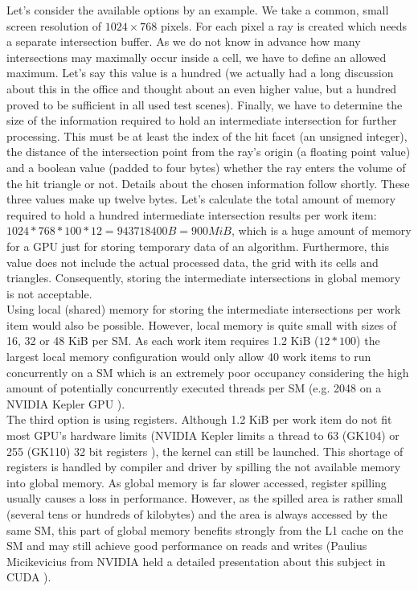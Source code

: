 Let's consider the available options by an example. We take a common, small screen resolution of $1024 \times 768$ pixels. For each pixel a ray is created which needs a separate intersection buffer. As we do not know in advance how many intersections may maximally occur inside a cell, we have to define an allowed maximum. Let's say this value is a hundred (we actually had a long discussion about this in the office and thought about an even higher value, but a hundred proved to be sufficient in all used test scenes). Finally, we have to determine the size of the information required to hold an intermediate intersection for further processing. This must be at least the index of the hit facet (an unsigned integer), the distance of the intersection point from the ray's origin (a floating point value) and a boolean value (padded to four bytes) whether the ray enters the volume of the hit triangle or not. Details about the chosen information follow shortly. These three values make up twelve bytes. Let's calculate the total amount of memory required to hold a hundred intermediate intersection results per work item: $1024 * 768 * 100 * 12 = 943718400 B = 900 MiB$, which is a huge amount of memory for a GPU just for storing temporary data of an algorithm. Furthermore, this value does not include the actual processed data, the grid with its cells and triangles. Consequently, storing the intermediate intersections in global memory is not acceptable. \\
Using local (shared) memory for storing the intermediate intersections per work item would also be possible. However, local memory is quite small with sizes of 16, 32 or 48 KiB per SM. As each work item requires 1.2 KiB ($12 * 100$) the largest local memory configuration would only allow 40 work items to run concurrently on a SM which is an extremely poor occupancy considering the high amount of potentially concurrently executed threads per SM (e.g. 2048 on a NVIDIA Kepler GPU \cite[p.7]{kepler_arch}). \\
The third option is using registers. Although 1.2 KiB per work item do not fit most GPU's hardware limits (NVIDIA Kepler limits a thread to 63 (GK104) or 255 (GK110) 32 bit registers \cite{kepler_arch}), the kernel can still be launched. This shortage of registers is handled by compiler and driver by spilling the not available memory into global memory. As global memory is far slower accessed, register spilling usually causes a loss in performance. However, as the spilled area is rather small (several tens or hundreds of kilobytes) and the area is always accessed by the same SM, this part of global memory benefits strongly from the L1 cache on the SM and may still achieve good performance on reads and writes (Paulius Micikevicius from NVIDIA held a detailed presentation about this subject in CUDA \cite{register_spilling}).

